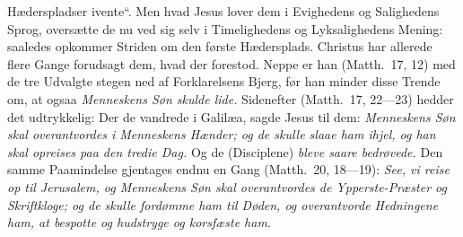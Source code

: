 \documentclass[12pt,a4paper]{book}
\begin{document}
Hæderspladser ivente“. Men hvad Jesus lover dem i
Evighedens og Salighedens Sprog, oversætte de nu ved sig selv i Timelighedens og
Lyksalighedens Mening: saaledes opkommer Striden om den første Hædersplads.
Christus har allerede flere Gange forudsagt dem, hvad der forestod. Neppe er han
(Matth.\ 17, 12) med de tre Udvalgte stegen ned af Forklarelsens Bjerg, før han
minder disse Trende om, at ogsaa \emph{Menneskens Søn skulde lide.} Sidenefter
(Matth.\ 17, 22---23) hedder det udtrykkelig: Der de vandrede i Galilæa, sagde
Jesus til dem: \emph{Menneskens Søn skal overantvordes i Menneskens Hænder; og
de skulle slaae ham ihjel, og han skal opreises paa den tredie Dag.} Og de
(Disciplene) \emph{bleve saare bedrøvede.} Den samme Paamindelse gjentages endnu
en Gang (Matth.\ 20, 18---19): \emph{See, vi reise op til Jerusalem, og
Menneskens Søn skal overantvordes de Ypperste-Præster og Skriftkloge; og de
skulle fordømme ham til Døden, og overantvorde Hedningene ham, at bespotte og
hudstryge og korsfæste ham.}
\end{document}
